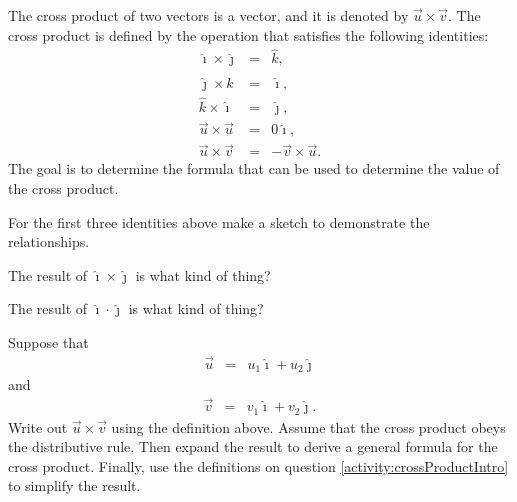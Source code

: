 \begin{problem}
\item The cross product of two vectors is a vector, and it is denoted by $\vec{u}\times\vec{v}$.
The cross product is defined by the operation that satisfies the following identities:
  \begin{eqnarray*}
    \hat{\imath} \times \hat{\jmath} & = & \hat{k}, \\
    \hat{\jmath} \times \hat{k} & = & \hat{\imath}, \\
    \hat{k} \times \hat{\imath} & = & \hat{\jmath}, \\
    \vec{u} \times \vec{u} & = & 0 \hat{\imath}, \\
    \vec{u} \times \vec{v} & = & - \vec{v} \times \vec{u}.
  \end{eqnarray*}
  The goal is to determine the formula that can be used to determine the value of the cross product.
  \label{activity:crossProductIntro}
  \begin{subproblem}
  \item For the first three identities above make a sketch to
    demonstrate the relationships.
    \vfill

    \item The result of $\hat{\imath}\times\hat{\jmath}$ is what kind of thing?
    \vspace{3em}

    \item The result of $\hat{\imath}\cdot\hat{\jmath}$ is what kind of thing?
    \vspace{3em}

    \clearpage

  \item Suppose that
    \begin{eqnarray*}
      \vec{u} & = & u_1 \hat{\imath} + u_2 \hat{\jmath}
    \end{eqnarray*}
    and
    \begin{eqnarray*}
      \vec{v} & = & v_1 \hat{\imath} + v_2 \hat{\jmath}.
    \end{eqnarray*}
    Write out $\vec{u}\times\vec{v}$ using the definition above.
    Assume that the cross product obeys the distributive rule.
    Then expand the result to derive a general formula for the cross product.
    Finally, use the definitions on question \ref{activity:crossProductIntro} to simplify the result.
    \vfill
    \vfill


\end{subproblem}
\end{problem}
